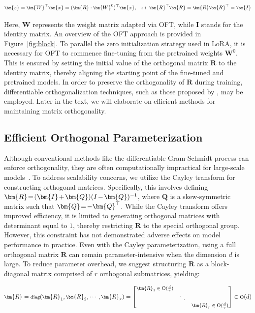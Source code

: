 \begin{equation}\label{eq:oft_general}
    \footnotesize
    \bm{z}=\bm{W}^\top\bm{x}=(\bm{R}\cdot\bm{W}^0)^\top\bm{x},~~~\text{s.t.}~\bm{R}^\top\bm{R}=\bm{R}\bm{R}^\top=\bm{I}
\end{equation}

Here, $\bm{W}$ represents the weight matrix adapted via OFT, while $\bm{I}$ stands for the identity matrix. An overview of the OFT approach is provided in Figure~\ref{fig:block}. To parallel the zero initialization strategy used in LoRA, it is necessary for OFT to commence fine-tuning from the pretrained weights $\bm{W}^0$. This is ensured by setting the initial value of the orthogonal matrix $\bm{R}$ to the identity matrix, thereby aligning the starting point of the fine-tuned and pretrained models. In order to preserve the orthogonality of $\bm{R}$ during training, differentiable orthogonalization techniques, such as those proposed by \cite{liu2021orthogonal,lezcano2019cheap}, may be employed. Later in the text, we will elaborate on efficient methods for maintaining matrix orthogonality.

\subsection{Efficient Orthogonal Parameterization}\label{sect:eff_ortho}

Although conventional methods like the differentiable Gram-Schmidt process can enforce orthogonality, they are often computationally impractical for large-scale models~\cite{liu2021orthogonal}. To address scalability concerns, we utilize the Cayley transform for constructing orthogonal matrices. Specifically, this involves defining $\thickmuskip=2mu \medmuskip=2mu \bm{R}=(\bm{I}+\bm{Q})(I-\bm{Q})^{-1}$, where $\bm{Q}$ is a skew-symmetric matrix such that $\thickmuskip=2mu \medmuskip=2mu \bm{Q}=-\bm{Q}^\top$. While the Cayley transform offers improved efficiency, it is limited to generating orthogonal matrices with determinant equal to $1$, thereby restricting $\bm{R}$ to the special orthogonal group. However, this constraint has not demonstrated adverse effects on model performance in practice. Even with the Cayley parameterization, using a full orthogonal matrix $\bm{R}$ can remain parameter-intensive when the dimension $d$ is large. To reduce parameter overhead, we suggest structuring $\bm{R}$ as a block-diagonal matrix comprised of $r$ orthogonal submatrices, yielding:

\begin{equation}
    \footnotesize
    \bm{R}=\text{diag}(\bm{R}_1,\bm{R}_2,\cdots,\bm{R}_r)=\begin{bmatrix}
    \bm{R}_1\in \text{O}(\frac{d}{r}) &  &\\
    &\ddots & \\
    & & \bm{R}_r\in \text{O}(\frac{d}{r})
    \end{bmatrix}\in \text{O}(d)
\end{equation}

